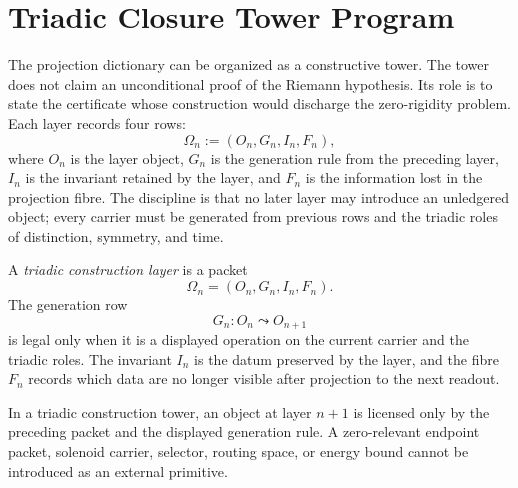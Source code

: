 \section{Triadic Closure Tower Program}
\label{sec:unified-reality-triadic-closure-tower-program}

The projection dictionary can be organized as a constructive tower.  The
tower does not claim an unconditional proof of the Riemann hypothesis.
Its role is to state the certificate whose construction would discharge
the zero-rigidity problem.  Each layer records four rows:
$$
\Omega_n:=(O_n,G_n,I_n,F_n),
$$
where $O_n$ is the layer object, $G_n$ is the generation rule from the
preceding layer, $I_n$ is the invariant retained by the layer, and $F_n$
is the information lost in the projection fibre.  The discipline is that
no later layer may introduce an unledgered object; every carrier must be
generated from previous rows and the triadic roles of distinction,
symmetry, and time.

\begin{definition}
\label{def:unified-reality-triadic-construction-layer}
A \emph{triadic construction layer} is a packet
$$
\Omega_n=(O_n,G_n,I_n,F_n).
$$
The generation row
$$
G_n:O_n\leadsto O_{n+1}
$$
is legal only when it is a displayed operation on the current carrier
and the triadic roles.  The invariant $I_n$ is the datum preserved by
the layer, and the fibre $F_n$ records which data are no longer visible
after projection to the next readout.
\end{definition}

\begin{principle}
\label{prin:unified-reality-no-unledgered-later-object}
In a triadic construction tower, an object at layer $n+1$ is licensed
only by the preceding packet and the displayed generation rule.  A
zero-relevant endpoint packet, solenoid carrier, selector, routing
space, or energy bound cannot be introduced as an external primitive.
\end{principle}

